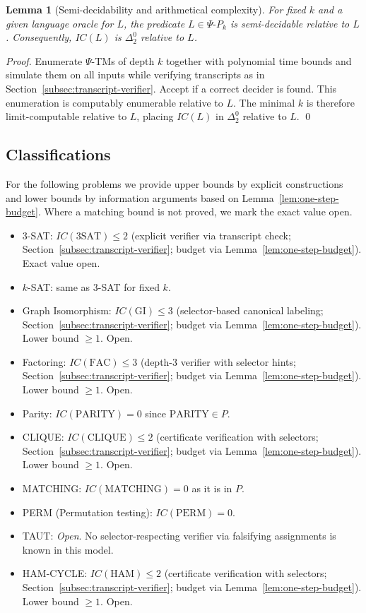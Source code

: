 \documentclass[11pt]{article}
\newtheorem{lemma}[theorem]{Lemma}
\theoremstyle{plain}
\theoremstyle{definition}
\newcommand{\PSi}{\Psi}
\begin{document}
\begin{lemma}[Semi-decidability and arithmetical complexity]
For fixed $k$ and a given language oracle for $L$, the predicate $L\in\Psi\text{-}P_k$ is semi-decidable relative to $L$. Consequently, $IC(L)$ is $\Delta^0_2$ relative to $L$.
\end{lemma}
\begin{proof}
Enumerate $\PSi$-TMs of depth $k$ together with polynomial time bounds and simulate them on all inputs while verifying transcripts as in Section~\ref{subsec:transcript-verifier}. Accept if a correct decider is found. This enumeration is computably enumerable relative to $L$. The minimal $k$ is therefore limit-computable relative to $L$, placing $IC(L)$ in $\Delta^0_2$ relative to $L$. \qed
\end{proof}

\subsection{Classifications}

For the following problems we provide upper bounds by explicit constructions and lower bounds by information arguments based on Lemma~\ref{lem:one-step-budget}. Where a matching bound is not proved, we mark the exact value open.

\begin{itemize}
\item 3-SAT: $IC(\mathrm{3SAT})\le 2$ (explicit verifier via transcript check; Section~\ref{subsec:transcript-verifier}; budget via Lemma~\ref{lem:one-step-budget}). Exact value open.
  \item $k$-SAT: same as 3-SAT for fixed $k$.
\item Graph Isomorphism: $IC(\mathrm{GI})\le 3$ (selector-based canonical labeling; Section~\ref{subsec:transcript-verifier}; budget via Lemma~\ref{lem:one-step-budget}). Lower bound $\ge1$. Open.
\item Factoring: $IC(\mathrm{FAC})\le 3$ (depth-3 verifier with selector hints; Section~\ref{subsec:transcript-verifier}; budget via Lemma~\ref{lem:one-step-budget}). Lower bound $\ge1$. Open.
  \item Parity: $IC(\mathrm{PARITY})=0$ since $\mathrm{PARITY}\in P$.
\item CLIQUE: $IC(\mathrm{CLIQUE})\le 2$ (certificate verification with selectors; Section~\ref{subsec:transcript-verifier}; budget via Lemma~\ref{lem:one-step-budget}). Lower bound $\ge1$. Open.
  \item MATCHING: $IC(\mathrm{MATCHING})=0$ as it is in $P$.
  \item PERM (Permutation testing): $IC(\mathrm{PERM})=0$.
  \item TAUT: \emph{Open}. No selector-respecting verifier via falsifying assignments is known in this model.
\item HAM-CYCLE: $IC(\mathrm{HAM})\le 2$ (certificate verification with selectors; Section~\ref{subsec:transcript-verifier}; budget via Lemma~\ref{lem:one-step-budget}). Lower bound $\ge1$. Open.
\end{itemize}
\end{document}
